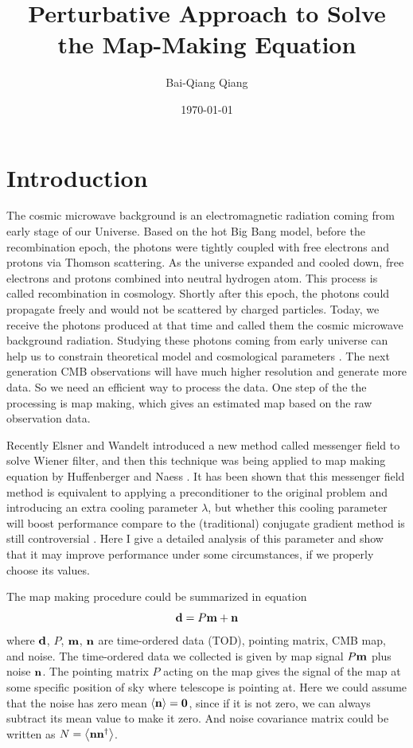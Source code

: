 \documentclass[11pt, letterpaper]{article}
\title{Perturbative Approach to Solve the Map-Making Equation}
\author{Bai-Qiang Qiang}
\date{\today}
\newcommand{\vbd}{\vb{d}}
\newcommand{\vbm}{\vb{m}}
\newcommand{\vbn}{\vb{n}}
\begin{document}
\maketitle

\section{Introduction}
The cosmic microwave background is an electromagnetic radiation coming from early
stage of our Universe. Based on the hot Big Bang model, before the recombination
epoch, the photons were tightly coupled with free electrons and protons via 
Thomson scattering. As the universe expanded and cooled down, free electrons and
protons combined into neutral hydrogen atom.  This process is called 
recombination in cosmology. Shortly after this epoch, the photons could
propagate freely and would not be scattered by charged particles. Today, we receive
the photons produced at that time and called them the cosmic microwave background
radiation. Studying these photons coming from early universe can help us
to constrain theoretical model and cosmological parameters
\cite{10.1093/ptep/ptaa104}.
The next generation CMB observations will have much higher resolution and 
generate more data. So we need an efficient way to process the data.
One step of the the processing is map making, which gives an estimated map based on the raw observation data.

Recently Elsner and Wandelt \cite{2013A&A...549A.111E} introduced a new
method called messenger field to solve Wiener filter, and then this technique
was being applied to map making equation by Huffenberger and Naess \cite{Huffenberger_2018}.
It has been shown that this messenger field method is equivalent to applying a
preconditioner to the original problem and introducing an extra cooling parameter $\lambda$, but whether this cooling parameter will boost performance compare to
 the (traditional) conjugate gradient method is still controversial \cite{2018A&A...620A..59P}. 
Here I give a detailed analysis of this parameter and show that
it may improve performance under some circumstances, if we properly choose
its values.

The map making procedure could be summarized in equation
\begin{equation}
\vbd = P\vbm + \vbn \label{map making model}
\end{equation}
where $\vbd$, $P$, $\vbm$, $\vbn$ are time-ordered data (TOD), pointing matrix,
CMB map, and noise.
The time-ordered data we collected is given by map signal $P\vbm$ plus noise 
$\vbn$.
The pointing matrix $P$ acting on the map gives the signal of the map at some specific 
position of sky where telescope is pointing at.
Here we could assume that the noise has zero mean $\ev{\vbn} = \vb{0}$,
since if it is not zero, we can always subtract its mean value to make it zero.
And noise covariance matrix could be written as $N = \ev{\vbn \vbn^{\dagger}}$.
\end{document}
